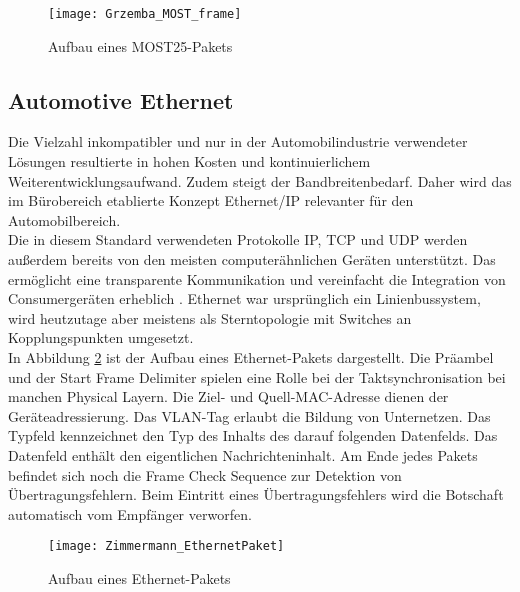 \begin{figure}[H]
\centering
\texttt{[image: Grzemba\_MOST\_frame]}
\label{fig:MOST-frame}
\caption{Aufbau eines \acs{MOST}25-Pakets}
\end{figure}


\subsection{Automotive Ethernet}
Die Vielzahl inkompatibler und nur in der Automobilindustrie verwendeter Lösungen resultierte in hohen Kosten und kontinuierlichem Weiterentwicklungsaufwand. Zudem steigt der Bandbreitenbedarf. Daher wird das im Bürobereich etablierte Konzept Ethernet/IP relevanter für den Automobilbereich. \cite[138]{Zimmermann.2014}\\
Die in diesem Standard verwendeten Protokolle \ac{IP}, \ac{TCP} und \ac{UDP} werden außerdem bereits von den meisten computerähnlichen Geräten unterstützt. Das ermöglicht eine transparente Kommunikation und vereinfacht die Integration von Consumergeräten erheblich \cite{Zimmermann.2014}. Ethernet war ursprünglich ein Linienbussystem, wird heutzutage aber meistens als Sterntopologie mit Switches an Kopplungspunkten umgesetzt. \\
In Abbildung \ref{fig:EthernetPaket} ist der Aufbau eines Ethernet-Pakets dargestellt. 
Die Präambel und der Start Frame Delimiter spielen eine Rolle bei der Taktsynchronisation bei manchen Physical Layern. Die Ziel- und Quell-MAC-Adresse dienen der Geräteadressierung. Das VLAN-Tag erlaubt die Bildung von Unternetzen. Das Typfeld kennzeichnet den Typ des Inhalts des darauf folgenden Datenfelds. Das Datenfeld enthält den eigentlichen Nachrichteninhalt. Am Ende jedes Pakets befindet sich noch die Frame Check Sequence zur Detektion von Übertragungsfehlern. Beim Eintritt eines Übertragungsfehlers wird die Botschaft automatisch vom Empfänger verworfen. \cite[140]{Zimmermann.2014}\\

\begin{figure}[H]
\centering
\texttt{[image: Zimmermann\_EthernetPaket]}
\label{fig:EthernetPaket}
\caption{Aufbau eines Ethernet-Pakets}
\end{figure}



